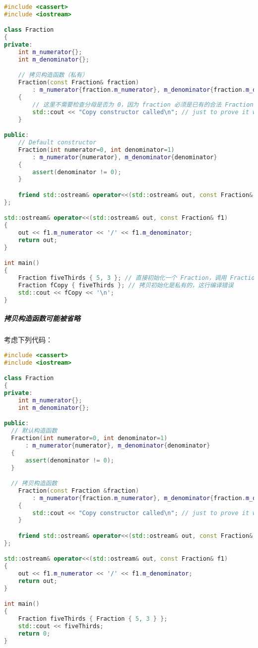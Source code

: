\documentclass[../../LearnCpp.tex]{subfiles}
\begin{document}
\begin{lstlisting}[language=C++]
#include <cassert>
#include <iostream>

class Fraction
{
private:
    int m_numerator{};
    int m_denominator{};

    // 拷贝构造函数（私有）
    Fraction(const Fraction& fraction)
        : m_numerator{fraction.m_numerator}, m_denominator{fraction.m_denominator}
    {
        // 这里不需要检查分母是否为 0，因为 fraction 必须是已有的合法 Fraction
        std::cout << "Copy constructor called\n"; // just to prove it works
    }

public:
    // Default constructor
    Fraction(int numerator=0, int denominator=1)
        : m_numerator{numerator}, m_denominator{denominator}
    {
        assert(denominator != 0);
    }

    friend std::ostream& operator<<(std::ostream& out, const Fraction& f1);
};

std::ostream& operator<<(std::ostream& out, const Fraction& f1)
{
	out << f1.m_numerator << '/' << f1.m_denominator;
	return out;
}

int main()
{
	Fraction fiveThirds { 5, 3 }; // 直接初始化一个 Fraction，调用 Fraction(int, int) 构造函数
	Fraction fCopy { fiveThirds }; // 拷贝初始化是私有的，这行编译错误
	std::cout << fCopy << '\n';
}
\end{lstlisting}

\subparagraph*{拷贝构造函数可能被省略}

考虑下列代码：

\begin{lstlisting}[language=C++]
#include <cassert>
#include <iostream>

class Fraction
{
private:
	int m_numerator{};
	int m_denominator{};

public:
  // 默认构造函数
  Fraction(int numerator=0, int denominator=1)
      : m_numerator{numerator}, m_denominator{denominator}
  {
      assert(denominator != 0);
  }

  // 拷贝构造函数
	Fraction(const Fraction &fraction)
		: m_numerator{fraction.m_numerator}, m_denominator{fraction.m_denominator}
	{
		std::cout << "Copy constructor called\n"; // just to prove it works
	}

	friend std::ostream& operator<<(std::ostream& out, const Fraction& f1);
};

std::ostream& operator<<(std::ostream& out, const Fraction& f1)
{
	out << f1.m_numerator << '/' << f1.m_denominator;
	return out;
}

int main()
{
	Fraction fiveThirds { Fraction { 5, 3 } };
	std::cout << fiveThirds;
	return 0;
}
\end{lstlisting}
\end{document}
